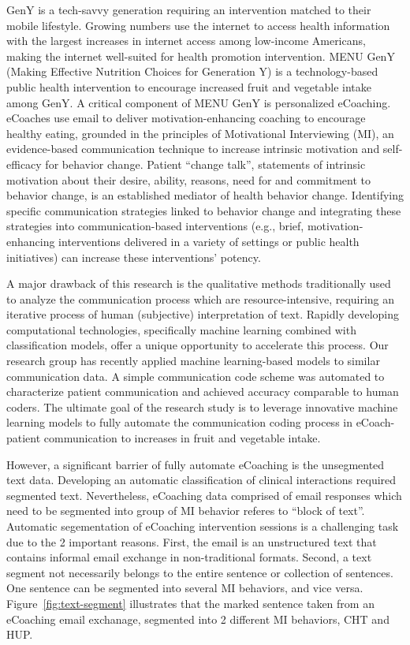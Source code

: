 \documentclass{amia}
\begin{document}
GenY is a tech-savvy generation requiring an intervention matched to their mobile lifestyle. Growing numbers use the internet to access health information with the largest increases in internet access among low-income Americans, making the internet well-suited for health promotion intervention\cite{strecher2007internet}. MENU GenY\cite{alexander2017motivations} (Making Effective Nutrition Choices for Generation Y) is a technology-based public health intervention to encourage increased fruit and vegetable intake among GenY. A critical component of MENU GenY is personalized eCoaching. eCoaches use email to deliver motivation-enhancing coaching to encourage healthy eating, grounded in the principles of Motivational Interviewing (MI), an evidence-based communication technique to increase intrinsic motivation and self-efficacy for behavior change\cite{miller2012motivational,miller2009ten,miller2009toward}. Patient ``change talk'', statements of intrinsic motivation about their desire, ability, reasons, need for and commitment to behavior change, is an established mediator of health behavior change\cite{apodaca2009mechanisms}. Identifying specific communication strategies linked to behavior change and integrating these strategies into communication-based interventions (e.g., brief, motivation-enhancing interventions delivered in a variety of settings or public health initiatives) can increase these interventions' potency.

A major drawback of this research is the qualitative methods traditionally used to analyze the communication process which are resource-intensive, requiring an iterative process of human (subjective) interpretation of text. Rapidly developing computational technologies, specifically machine learning combined with classification models, offer a unique opportunity to accelerate this process. Our research group has recently applied machine learning-based models to similar communication data\cite{hasan2016study,kotov2015interpretable}. A simple communication code scheme was automated to characterize patient communication and achieved accuracy comparable to human coders\cite{hasan2016study}. The ultimate goal of the research study is to leverage innovative machine learning models to fully automate the communication coding process in eCoach-patient communication to increases in fruit and vegetable intake. 

However, a significant barrier of fully automate eCoaching is the unsegmented text data. Developing an automatic classification of clinical interactions required segmented text. Nevertheless, eCoaching data comprised of email responses which need to be segmented into group of MI behavior referes to ``block of text''. Automatic segementation of eCoaching intervention sessions is a challenging task due to the 2 important reasons. First, the email is an unstructured text that contains informal email exchange in non-traditional formats. Second, a text segment not necessarily belongs to the entire sentence or collection of sentences. One sentence can be segmented into several MI behaviors, and vice versa. Figure~\ref{fig:text-segment} illustrates that the marked sentence taken from an eCoaching email exchanage, segmented into 2 different MI behaviors, CHT and HUP. 
\end{document}

